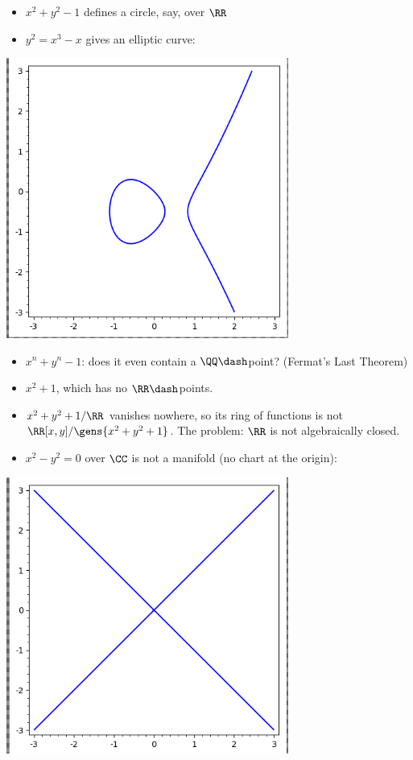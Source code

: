 \begin{example}

\hfill

\begin{itemize}
\item
  \(x^2 + y^2 - 1\) defines a circle, say, over \(\RR\)
\item
  \(y^2 = x^3-x\) gives an elliptic curve:
\end{itemize}

\includegraphics[width=3.64583in,height=\textheight]{figures/image_2020-08-21-01-04-22.png}

\begin{itemize}
\item
  \(x^n+y^n-1\): does it even contain a \(\QQ\dash\)point? (Fermat's
  Last Theorem)
\item
  \(x^2 + 1\), which has no \(\RR\dash\)points.
\item
  \(x^2 + y^2 + 1/\RR\) vanishes nowhere, so its ring of functions is
  not \(\RR[x, y] / \gens{x^2 + y^2 + 1}\). The problem: \(\RR\) is not
  algebraically closed.
\item
  \(x^2 - y^2 = 0\) over \(\CC\) is not a manifold (no chart at the
  origin):
\end{itemize}

\includegraphics[width=3.64583in,height=\textheight]{figures/image_2020-08-21-01-23-32.png}


\end{example}
